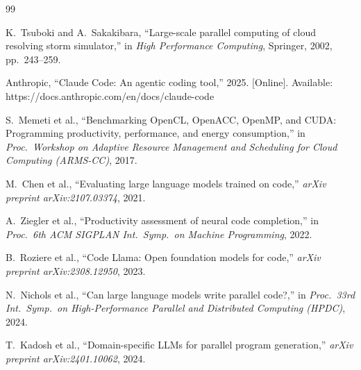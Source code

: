 \documentclass[conference]{IEEEtran}
\begin{document}
\begin{thebibliography}{99}

K.~Tsuboki and A.~Sakakibara, ``Large-scale parallel computing of cloud
resolving storm simulator,'' in \emph{High Performance Computing}, Springer,
2002, pp.~243--259.

Anthropic, ``Claude Code: An agentic coding tool,'' 2025. [Online].
Available: https://docs.anthropic.com/en/docs/claude-code

S.~Memeti et al., ``Benchmarking OpenCL, OpenACC, OpenMP, and CUDA:
Programming productivity, performance, and energy consumption,'' in
\emph{Proc.\ Workshop on Adaptive Resource Management and Scheduling for
Cloud Computing (ARMS-CC)}, 2017.

M.~Chen et al., ``Evaluating large language models trained on code,''
\emph{arXiv preprint arXiv:2107.03374}, 2021.

A.~Ziegler et al., ``Productivity assessment of neural code completion,''
in \emph{Proc.\ 6th ACM SIGPLAN Int.\ Symp.\ on Machine Programming}, 2022.

B.~Roziere et al., ``Code Llama: Open foundation models for code,''
\emph{arXiv preprint arXiv:2308.12950}, 2023.

N.~Nichols et al., ``Can large language models write parallel code?,'' in
\emph{Proc.\ 33rd Int.\ Symp.\ on High-Performance Parallel and Distributed
Computing (HPDC)}, 2024.

T.~Kadosh et al., ``Domain-specific LLMs for parallel program generation,''
\emph{arXiv preprint arXiv:2401.10062}, 2024.

\end{thebibliography}
\end{document}
